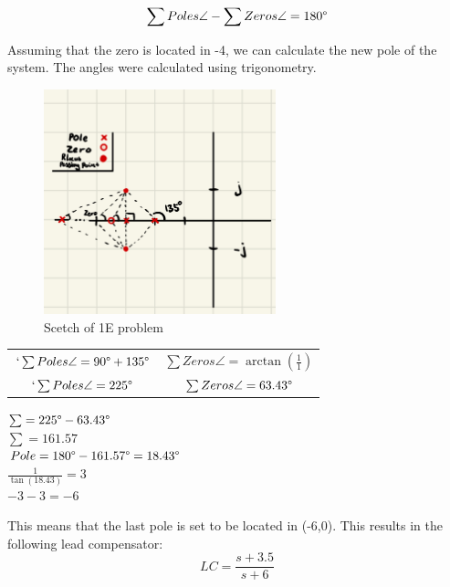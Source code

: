 \begin{equation}
    \sum Poles \angle - \sum Zeros \angle = 180\degree \\
\end{equation}

Assuming that the zero is located in -4, we can calculate the new pole of the system. The angles were calculated using trigonometry.

\begin{figure}[h!]
    \centering
    \includegraphics[width = 0.6\textwidth]{Images/1E_Plot.jpeg}
    \caption{Scetch of 1E problem}
    \label{fig:1E_Plot}
\end{figure}


\begin{center}
\begin{tabular}{c c}
    $`\sum Poles \angle = 90 \degree + 135 \degree$ & $\sum Zeros \angle = \arctan (\frac{1}{1})$ \\
    $`\sum Poles \angle = 225 \degree $ & $\sum Zeros \angle = 63.43 \degree$\\
\end{tabular}
\end{center}

\begin{center}
    $\sum = 225 \degree - 63.43 \degree$ \\ 
    $\sum = 161.57$ \\
    $Pole = 180 \degree - 161.57 \degree = 18.43 \degree$ \\
    $\frac{1}{\tan (18.43)} = 3$ \\
    $-3 - 3 = -6$
\end{center}

This means that the last pole is set to be located in (-6,0).
This results in the following lead compensator:
\begin{equation}
    LC = \frac{s+3.5}{s+6}
\end{equation}


